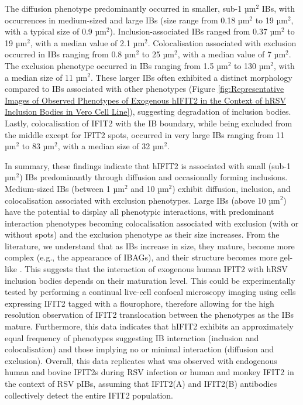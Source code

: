 The diffusion phenotype predominantly occurred in smaller, sub-1 \(\mbox{µm}^2\) IBs, with occurrences in medium-sized and large IBs (size range from 0.18 \(\mbox{µm}^2\) to 19 \(\mbox{µm}^2\), with a typical size of 0.9 \(\mbox{µm}^2\)). Inclusion-associated IBs ranged from 0.37 \(\mbox{µm}^2\) to 19 \(\mbox{µm}^2\), with a median value of 2.1 \(\mbox{µm}^2\). Colocalisation associated with exclusion occurred in IBs ranging from 0.8 \(\mbox{µm}^2\) to 25 \(\mbox{µm}^2\), with a median value of 7 \(\mbox{µm}^2\). The exclusion phenotype occurred in IBs ranging from 1.5 \(\mbox{µm}^2\) to 130 \(\mbox{µm}^2\), with a median size of 11 \(\mbox{µm}^2\). These larger IBs often exhibited a distinct morphology compared to IBs associated with other phenotypes (Figure \ref{fig:Representative Images of Observed Phenotypes of Exogenous hIFIT2 in the Context of hRSV Inclusion Bodies in Vero Cell Line}), suggesting degradation of inclusion bodies. Lastly, colocalisation of IFIT2 with the IB boundary, while being excluded from the middle except for IFIT2 spots, occurred in very large IBs ranging from 11 \(\mbox{µm}^2\) to 83 \(\mbox{µm}^2\), with a median size of 32 \(\mbox{µm}^2\).

In summary, these findings indicate that hIFIT2 is associated with small (sub-1 \(\mbox{µm}^2\)) IBs predominantly through diffusion and occasionally forming inclusions. Medium-sized IBs (between 1 \(\mbox{µm}^2\) and 10 \(\mbox{µm}^2\)) exhibit diffusion, inclusion, and colocalisation associated with exclusion phenotypes. Large IBs (above 10 \(\mbox{µm}^2\)) have the potential to display all phenotypic interactions, with predominant interaction phenotypes becoming colocalisation associated with exclusion (with or without spots) and the exclusion phenotype as their size increases. From the literature, we understand that as IBs increase in size, they mature, become more complex (e.g., the appearance of IBAGs), and their structure becomes more gel-like \cite{Weber1995NonstructuralSerum, Fricke2013P38Assembly, Rincheval2017FunctionalVirus, Jobe2021BovineResponses}. This suggests that the interaction of exogenous human IFIT2 with hRSV inclusion bodies depends on their maturation level. This could be experimentally tested by performing a continual live-cell confocal microscopy imaging using cells expressing IFIT2 tagged with a flourophore, therefore allowing for the high resolution observation of IFIT2 translocation between the phenotypes as the IBs mature. Furthermore, this data indicates that hIFIT2 exhibits an approximately equal frequency of phenotypes suggesting IB interaction (inclusion and colocalisation) and those implying no or minimal interaction (diffusion and exclusion). Overall, this data replicates what was observed with endogenous human and bovine IFIT2s during RSV infection or human and monkey IFIT2 in the context of RSV pIBs, assuming that IFIT2(A) and IFIT2(B) antibodies collectively detect the entire IFIT2 population.

